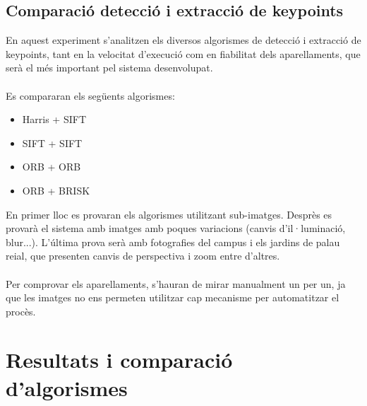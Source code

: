 	\subsection{Comparació detecció i extracció de keypoints}
		En aquest experiment s'analitzen els diversos algorismes de detecció i extracció de keypoints, tant en la velocitat d'execució com en fiabilitat dels aparellaments, que serà el més important
		pel sistema desenvolupat.\\\\
		Es compararan els següents algorismes:
		\begin{multicols}{2} 
			\begin{itemize}
				\item{Harris + SIFT}
				\item{SIFT + SIFT}
				\item{ORB + ORB}
				\item{ORB + BRISK}
			\end{itemize}
		\end{multicols}
		\noindent
		En primer lloc es provaran els algorismes utilitzant sub-imatges. Desprès es provarà el sistema amb imatges amb poques variacions (canvis d'il·luminació, blur...). L'última prova serà amb fotografies
		del campus i els jardins de palau reial, que presenten canvis de perspectiva i zoom entre d'altres.\\\\
		Per comprovar els aparellaments, s'hauran de mirar manualment un per un, ja que les imatges no ens permeten utilitzar cap mecanisme per automatitzar el procès.
\newpage
\section{Resultats i comparació d'algorismes}

